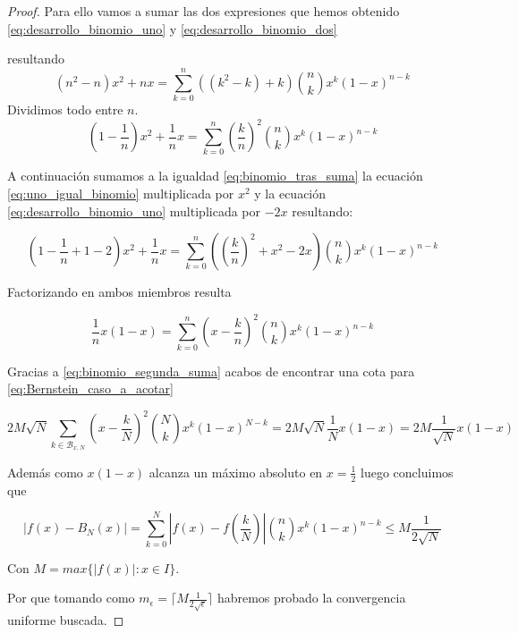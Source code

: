 \begin{proof}
Para ello vamos a sumar las dos expresiones que hemos obtenido
 \eqref{eq:desarrollo_binomio_uno} y \eqref{eq:desarrollo_binomio_dos}

 resultando 
 \begin{equation} 
    (n^2 - n)  x^2 + nx= \sum_{k=0}^{n} ((k^2 - k)+k) \binom{n}{k} x^{k} (1-x)^{n-k}
  \end{equation}
  Dividimos todo entre $n$. 
  \begin{equation} \label{eq:binomio_tras_suma}
    (1 - \frac{1}{n})  x^2 + \frac{1}{n}x= \sum_{k=0}^{n} \left( \frac{k}{n} \right)^2 \binom{n}{k} x^{k} (1-x)^{n-k}
  \end{equation}

  A continuación sumamos a la igualdad \eqref{eq:binomio_tras_suma} la ecuación \eqref{eq:uno_igual_binomio} multiplicada por $x^2$ y la ecuación \eqref{eq:desarrollo_binomio_uno}
  multiplicada por $-2x$ resultando: 


  \begin{equation} 
    (1 - \frac{1}{n} + 1 -2)  x^2 + \frac{1}{n}x= \sum_{k=0}^{n} \left( \left( \frac{k}{n} \right)^2 + x^2 -2x \right) \binom{n}{k} x^{k} (1-x)^{n-k}
  \end{equation}

  Factorizando en ambos miembros resulta

  \begin{equation} \label{eq:binomio_segunda_suma}
     \frac{1}{n} x (1-x)= \sum_{k=0}^{n}  \left( x-\frac{k}{n} \right)^2  \binom{n}{k} x^{k} (1-x)^{n-k}
  \end{equation}

  Gracias a \eqref{eq:binomio_segunda_suma} acabos de encontrar una cota para 
  \eqref{eq:Bernstein_caso_a_acotar}

  \begin{equation}
    2M \sqrt{N} \sum_{k \in \mathcal{B}_{x,N}}  (x- \frac{k}{N})^2 \binom{N}{k} x^k (1-x) ^{N-k}  = 2M \sqrt{N} \frac{1}{N} x (1-x) = 2M  \frac{1}{\sqrt{N}} x (1-x)
  \end{equation}

  Además como $x (1-x)$ alcanza un máximo absoluto en $x=\frac{1}{2}$ luego concluimos que 

  \begin{equation}
    |f(x)-B_N(x)| = \sum_{k=0}^N \left| f(x) - f \left(\frac{k}{N} \right) \right| \binom{n}{k} x^k (1-x) ^{n-k} \leq M \frac{1}{2 \sqrt{N}} 
\end{equation}

    Con $M = max \{ |f(x)| : x \in I\}.$

    Por que tomando como $m_\epsilon = \lceil M \frac{1}{2 \sqrt{ \epsilon }} \rceil$
    habremos probado la convergencia uniforme buscada. 

\end{proof}

